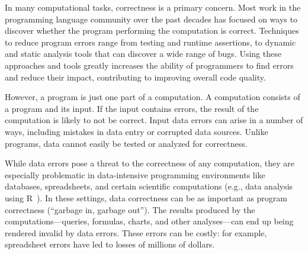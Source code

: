 In many computational tasks, correctness is a primary concern. Most
work in the programming language community over the past decades has
focused on ways to discover whether the program performing the
computation is correct. Techniques to reduce program errors range from
testing and runtime assertions, to dynamic and static analysis tools
that can discover a wide range of bugs. Using these approaches and
tools greatly increases the ability of programmers to find errors and
reduce their impact, contributing to improving overall code quality.


However, a program is just one part of a computation. A computation
consists of a program and its input. If the input contains errors, the
result of the computation is likely to not be correct. Input data
errors can arise in a number of ways, including mistakes in data entry
or corrupted data sources. Unlike programs, data cannot easily be
tested or analyzed for correctness.


While data errors pose a threat to the correctness of any computation,
they are especially problematic in data-intensive programming
environments like databases, spreadsheets, and certain scientific
computations (e.g., data analysis using R~\cite{ihaka1996r}). In these settings,
data correctness can be as important as program correctness (``garbage
in, garbage out''). The results produced by the
computations---queries, formulas, charts, and other analyses---can end
up being rendered invalid by data errors. These errors can be costly:
for example, spreadsheet errors have led to losses of millions of
dollars. %




